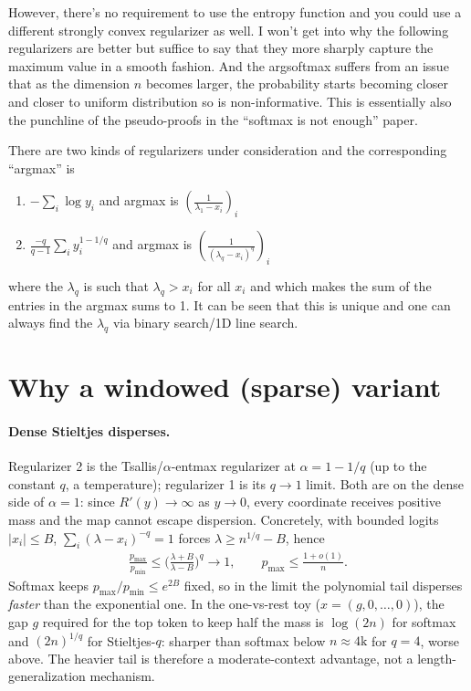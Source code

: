 \documentclass{article}
\begin{document}
However, there's no requirement to use the entropy function and you could use a different strongly convex regularizer as well. 
I won't get into why the following regularizers are better but suffice to say that they more sharply capture the maximum value in a smooth fashion. And the argsoftmax suffers from an issue that as the dimension $n$ becomes larger, the probability starts becoming closer and closer to uniform distribution so is non-informative. This is essentially also the punchline of the pseudo-proofs in the ``softmax is not enough'' paper.

There are two kinds of regularizers under consideration and the corresponding ``argmax'' is
\begin{enumerate}
\item $- \sum\limits_i \log y_i$ and argmax is $\left(\frac{1}{\lambda_1 - x_i}\right)_i$
\item $\frac{-q}{q-1}\sum\limits_i y_i^{1-1/q}$ and argmax is $\left(\frac{1}{(\lambda_q - x_i)^q}\right)_i$
\end{enumerate}
where the $\lambda_q$ is such that $\lambda_q > x_i$ for all $x_i$ and which makes the sum of the entries in the argmax sums to 1. It can be seen that this is unique and one can always find the $\lambda_q$ via binary search/1D line search.

\section{Why a windowed (sparse) variant}

\paragraph{Dense Stieltjes disperses.} Regularizer 2 is the Tsallis/$\alpha$-entmax regularizer at
$\alpha = 1 - 1/q$ (up to the constant $q$, a temperature); regularizer 1 is its $q \to 1$ limit. Both
are on the dense side of $\alpha = 1$: since $R'(y) \to \infty$ as $y \to 0$, every coordinate receives
positive mass and the map cannot escape dispersion. Concretely, with bounded logits $|x_i| \le B$,
$\sum_i (\lambda - x_i)^{-q} = 1$ forces $\lambda \ge n^{1/q} - B$, hence
\begin{align*}
\frac{p_{\max}}{p_{\min}} \le \Big(\frac{\lambda + B}{\lambda - B}\Big)^{q} \to 1, \qquad
p_{\max} \le \frac{1 + o(1)}{n}.
\end{align*}
Softmax keeps $p_{\max}/p_{\min} \le e^{2B}$ fixed, so in the limit the polynomial tail disperses
\emph{faster} than the exponential one. In the one-vs-rest toy ($x = (g, 0, \dots, 0)$), the gap $g$
required for the top token to keep half the mass is $\log(2n)$ for softmax and $(2n)^{1/q}$ for
Stieltjes-$q$: sharper than softmax below $n \approx 4\mathrm{k}$ for $q = 4$, worse above. The
heavier tail is therefore a moderate-context advantage, not a length-generalization mechanism.
\end{document}
